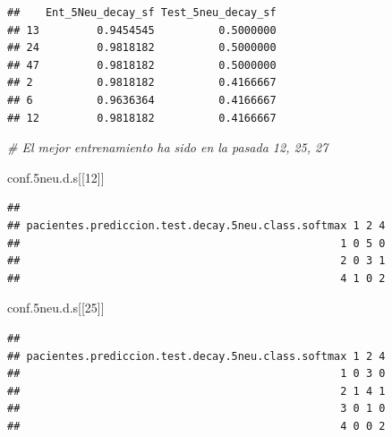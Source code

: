 \documentclass[]{article}
\newenvironment{Shaded}{\begin{snugshade}}{\end{snugshade}}
\newcommand{\CommentTok}[1]{\textcolor[rgb]{0.56,0.35,0.01}{\textit{#1}}}
\newcommand{\DataTypeTok}[1]{\textcolor[rgb]{0.13,0.29,0.53}{#1}}
\newcommand{\DecValTok}[1]{\textcolor[rgb]{0.00,0.00,0.81}{#1}}
\newcommand{\FloatTok}[1]{\textcolor[rgb]{0.00,0.00,0.81}{#1}}
\newcommand{\KeywordTok}[1]{\textcolor[rgb]{0.13,0.29,0.53}{\textbf{#1}}}
\newcommand{\NormalTok}[1]{#1}
\newcommand{\OperatorTok}[1]{\textcolor[rgb]{0.81,0.36,0.00}{\textbf{#1}}}
\newcommand{\StringTok}[1]{\textcolor[rgb]{0.31,0.60,0.02}{#1}}
\begin{document}
\begin{Shaded}
\end{Shaded}

\begin{verbatim}
##    Ent_5Neu_decay_sf Test_5neu_decay_sf
## 13         0.9454545          0.5000000
## 24         0.9818182          0.5000000
## 47         0.9818182          0.5000000
## 2          0.9818182          0.4166667
## 6          0.9636364          0.4166667
## 12         0.9818182          0.4166667
\end{verbatim}

\begin{Shaded}
\begin{Highlighting}[]
\CommentTok{# El mejor entrenamiento ha sido en la pasada 12, 25, 27}

\NormalTok{conf}\FloatTok{.5}\NormalTok{neu.d.s[[}\DecValTok{12}\NormalTok{]]}
\end{Highlighting}
\end{Shaded}

\begin{verbatim}
##                                                   
## pacientes.prediccion.test.decay.5neu.class.softmax 1 2 4
##                                                  1 0 5 0
##                                                  2 0 3 1
##                                                  4 1 0 2
\end{verbatim}

\begin{Shaded}
\begin{Highlighting}[]
\NormalTok{conf}\FloatTok{.5}\NormalTok{neu.d.s[[}\DecValTok{25}\NormalTok{]]}
\end{Highlighting}
\end{Shaded}

\begin{verbatim}
##                                                   
## pacientes.prediccion.test.decay.5neu.class.softmax 1 2 4
##                                                  1 0 3 0
##                                                  2 1 4 1
##                                                  3 0 1 0
##                                                  4 0 0 2
\end{verbatim}
\end{document}
